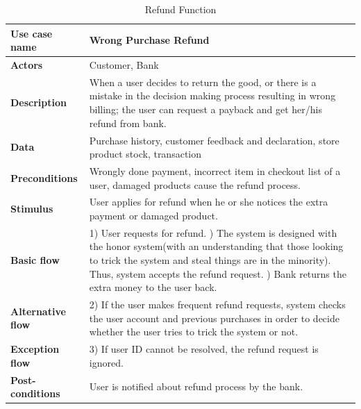  \begin{table}[H]
     \centering
     \begin{tabular}{ | l | p{10cm} |}
     \hline
     \textbf{Use case name}    & Wrong Purchase Refund \\
     \hline
     \textbf{Actors}           & Customer, Bank \\
     \hline
     \textbf{Description}      & When a user decides to return the good, or there is a mistake in the decision making process resulting in wrong billing; the user can request a payback and get her/his refund from bank. \\
     \hline
     \textbf{Data}             & Purchase history, customer feedback and declaration, store product stock, transaction \\
     \hline
     \textbf{Preconditions}    & Wrongly done payment, incorrect item in checkout list of a user, damaged products cause the refund process.\\
     \hline
     \textbf{Stimulus}         & User applies for refund when he or she notices the extra payment or damaged product. \\
     \hline
     \textbf{Basic flow}       & 1) User requests for refund. \newline 2) The system is designed with the honor system(with an understanding that those looking to trick the system and steal things are in the minority). Thus, system accepts the refund request. \newline 3) Bank returns the extra money to the user back. \\
     \hline
     \textbf{Alternative flow} & 2) If the user makes frequent refund requests, system checks the user account and previous purchases in order to decide whether the user tries to trick the system or not.  \\
     \hline
     \textbf{Exception flow}   & 3) If user ID cannot be resolved, the refund request is ignored.  \\
     \hline
     \textbf{Post-conditions}  & User is notified about refund process by the bank. \\
     \hline
    \end{tabular}     \caption{Refund Function}
     \label{tab:04refund}
 \end{table}

